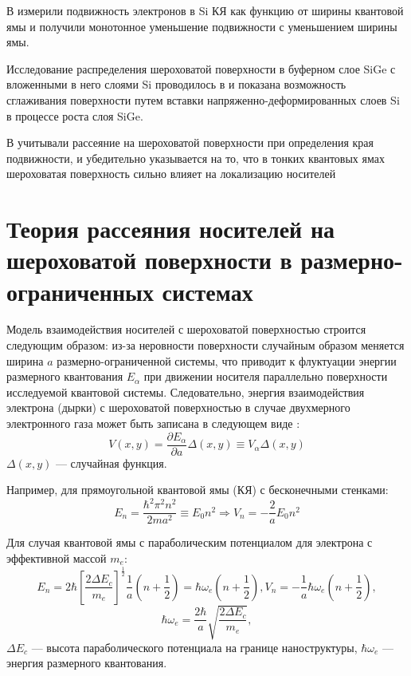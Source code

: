 В \cite{Yutani1996} измерили подвижность электронов в Si КЯ как функцию от ширины квантовой ямы и получили монотонное уменьшение подвижности с уменьшением ширины ямы.

Исследование распределения шероховатой поверхности в буферном слое SiGe с вложенными в него слоями Si проводилось в \cite{Yoon2005} и показана возможность сглаживания поверхности путем вставки напряженно-деформированных слоев Si в процессе роста слоя SiGe.

В \cite{Tito2017} учитывали рассеяние на шероховатой поверхности при определения края подвижности, и убедительно указывается на то, что в тонких квантовых ямах шероховатая поверхность сильно влияет на локализацию носителей


\section{Теория рассеяния носителей на шероховатой поверхности в размерно-ограниченных системах} \label{sect1_2}
Модель взаимодействия носителей с шероховатой поверхностью строится следующим образом: из-за неровности поверхности случайным образом меняется ширина $a$ размерно-ограниченной системы, что приводит к флуктуации энергии размерного квантования $E_{\alpha}$ при движении носителя параллельно поверхности исследуемой квантовой системы. Следовательно, энергия взаимодействия электрона (дырки) с шероховатой поверхностью в случае двухмерного электронного газа может быть записана в следующем виде \cite{Sakaki1987}:
\begin{equation}
\label{eq:1_1}
V(x,y)=\frac{\partial E_{\alpha}}{\partial a}\Delta(x,y)\equiv V_{\alpha} \Delta(x,y)
\end{equation}
$\Delta(x,y)$ --- случайная функция.

Например, для прямоугольной квантовой ямы (КЯ) с бесконечными стенками:
\begin{equation}
\label{eq:1_2}
E_n = \frac{\hbar^2 \pi^2 n^2}{2ma^2} \equiv E_0 n^2 \Rightarrow V_n = -\frac{2}{a}E_0 n^2
\end{equation}

Для случая квантовой ямы с параболическим потенциалом для электрона с эффективной массой $m_e$:
\begin{equation}
\label{eq:1_3}
E_n=2\hbar \left[ \frac{2\Delta E_c} {m_e} \right]^\frac{1}{2} \frac{1}{a}\left( n + \frac{1}{2} \right) = \hbar \omega_e \left( n + \frac{1}{2} \right), V_n = -\frac{1}{a} \hbar \omega_e \left( n + \frac{1}{2} \right),
\end{equation}
\[
\hbar \omega_e = \frac{2\hbar}{a}\sqrt{\frac{2 \Delta E_c}{m_e}},
\]
$\Delta E_c$ --- высота параболического потенциала на границе наноструктуры, $\hbar \omega_e$ --- энергия размерного квантования.

